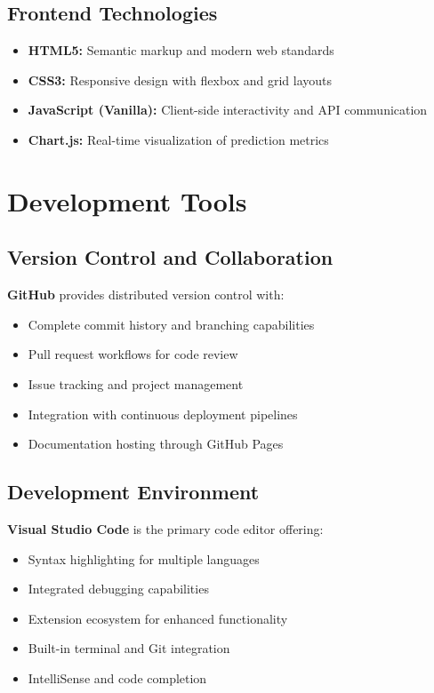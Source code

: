 \documentclass[12pt,a4paper,twoside]{report}
\begin{document}
\subsection*{Frontend Technologies}

\begin{itemize}
    \item \textbf{HTML5:} Semantic markup and modern web standards
    \item \textbf{CSS3:} Responsive design with flexbox and grid layouts
    \item \textbf{JavaScript (Vanilla):} Client-side interactivity and API communication
    \item \textbf{Chart.js:} Real-time visualization of prediction metrics
\end{itemize}

\section*{Development Tools}

\subsection*{Version Control and Collaboration}

\textbf{GitHub} provides distributed version control with:

\begin{itemize}
    \item Complete commit history and branching capabilities
    \item Pull request workflows for code review
    \item Issue tracking and project management
    \item Integration with continuous deployment pipelines
    \item Documentation hosting through GitHub Pages
\end{itemize}

\subsection*{Development Environment}

\textbf{Visual Studio Code} is the primary code editor offering:

\begin{itemize}
    \item Syntax highlighting for multiple languages
    \item Integrated debugging capabilities
    \item Extension ecosystem for enhanced functionality
    \item Built-in terminal and Git integration
    \item IntelliSense and code completion
\end{itemize}
\end{document}

